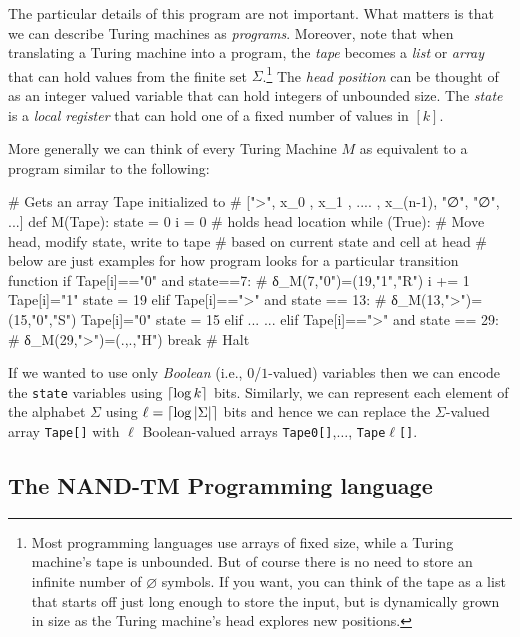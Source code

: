 The particular details of this program are not important. What matters
is that we can describe Turing machines as \emph{programs}. Moreover,
note that when translating a Turing machine into a program, the
\emph{tape} becomes a \emph{list} or \emph{array} that can hold values
from the finite set \(\Sigma\).\footnote{Most programming languages use
  arrays of fixed size, while a Turing machine's tape is unbounded. But
  of course there is no need to store an infinite number of
  \(\varnothing\) symbols. If you want, you can think of the tape as a
  list that starts off just long enough to store the input, but is
  dynamically grown in size as the Turing machine's head explores new
  positions.} The \emph{head position} can be thought of as an integer
valued variable that can hold integers of unbounded size. The
\emph{state} is a \emph{local register} that can hold one of a fixed
number of values in \([k]\).

More generally we can think of every Turing Machine \(M\) as equivalent
to a program similar to the following:

\begin{code}
# Gets an array Tape initialized to
# [">", x_0 , x_1 , .... , x_(n-1), "∅", "∅", ...]
def M(Tape):
    state = 0
    i     = 0 # holds head location
    while (True):
        # Move head, modify state, write to tape
        # based on current state and cell at head
        # below are just examples for how program looks for a particular transition function
        if Tape[i]=="0" and state==7: # δ_M(7,"0")=(19,"1","R")
            i += 1
            Tape[i]="1"
            state = 19
        elif Tape[i]==">" and state == 13: # δ_M(13,">")=(15,"0","S")
            Tape[i]="0"
            state = 15
        elif ...
        ...
        elif Tape[i]==">" and state == 29: # δ_M(29,">")=(.,.,"H")
            break # Halt
\end{code}

If we wanted to use only \emph{Boolean} (i.e., \(0\)/\(1\)-valued)
variables then we can encode the \texttt{state} variables using
\(\lceil \log k \rceil\) bits. Similarly, we can represent each element of the
alphabet \(\Sigma\) using \(\ell=\lceil \log |\Sigma| \rceil\) bits and hence
we can replace the \(\Sigma\)-valued array \texttt{Tape[]} with \(\ell\)
Boolean-valued arrays \texttt{Tape0[]},\(\ldots\),
\texttt{Tape}\(\ell\)\texttt{[]}.

\subsection{The NAND-TM Programming
language}\label{The-NAND-TM-Programming-l}

